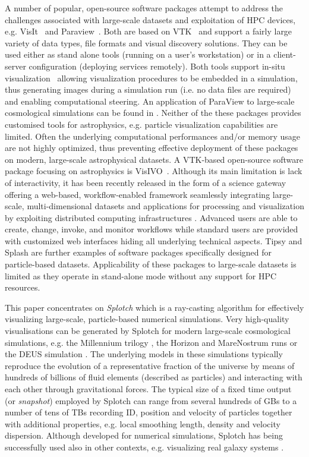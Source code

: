 \documentclass[1p]{elsarticle}
\begin{document}
A number of popular, open-source software packages attempt to address the challenges associated with large-scale datasets and exploitation of HPC devices, e.g. VisIt~\cite{visit} and Paraview~\cite{paraview}. Both are based on VTK~\cite{vtk} and support a fairly large variety of data types, file formats and visual discovery solutions. They can be used either as stand alone tools (running on a user's workstation) or in a client-server configuration (deploying services remotely). Both tools support in-situ visualization~\cite{in-situ} allowing visualization procedures to be embedded in a simulation, thus generating images during a simulation run (i.e. no data files are required) and enabling computational steering. An application of ParaView to large-scale cosmological simulations can be found in \cite{2011ApJS..195...11W}. Neither of the these packages provides customised tools for astrophysics,  e.g. particle visualization capabilities are limited. Often the underlying computational performances and/or memory usage are not highly optimized, thus preventing effective deployment of these packages on modern, large-scale astrophysical datasets. A VTK-based open-source software package focusing on astrophysics is VisIVO~\cite{visivo}. Although its main limitation is lack of interactivity, it has been recently released in the form of a science gateway offering a web-based, workflow-enabled framework seamlessly integrating large-scale, multi-dimensional datasets and applications for processing and visualization by exploiting distributed computing infrastructures \cite{VisIVOGateway}. Advanced users are able to create, change, invoke, and monitor workflows while standard users are provided with customized web interfaces hiding all underlying technical aspects. Tipsy \cite{tipsyurl} and Splash \cite{splash} are further examples of software packages specifically designed for particle-based datasets. Applicability of these packages to large-scale datasets is limited as they operate in stand-alone mode without any support for HPC resources.

This paper concentrates on {\it Splotch} \cite{2008NJPh...10l5006D} which is a ray-casting algorithm for effectively visualizing large-scale, particle-based numerical simulations. Very high-quality visualisations can be generated by Splotch for modern large-scale cosmological simulations, e.g. the Millennium trilogy \cite{millennium}, the Horizon and MareNostrum runs \cite{horizon} or the DEUS simulation \cite{deus}. The underlying models in these simulations typically reproduce the evolution of a representative fraction of the universe by means of hundreds of billions of fluid elements (described as particles) and interacting with each other through gravitational forces. The typical size of a fixed time output (or {\it snapshot}) employed by Splotch can range from several hundreds of GBs to a number of tens of TBs recording ID, position and velocity of particles together with additional properties, e.g. local smoothing length, density and velocity dispersion. Although developed for numerical simulations, Splotch has being successfully used 
also in other contexts, e.g. visualizing real galaxy systems \cite{}.
\end{document}
